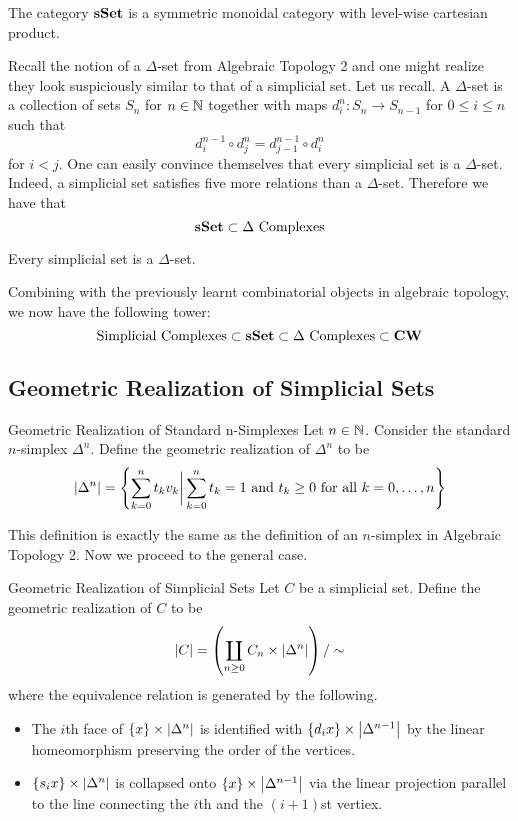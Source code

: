 \documentclass[a4paper]{article}
\begin{document}
\begin{thm}{}{} The category $\bold{sSet}$ is a symmetric monoidal category with level-wise cartesian product. 
\end{thm}

Recall the notion of a $\Delta$-set from Algebraic Topology 2 and one might realize they look suspiciously similar to that of a simplicial set. Let us recall. A $\Delta$-set is a collection of sets $S_n$ for $n\in\mathbb{N}$ together with maps $d_i^n:S_n\to S_{n-1}$ for $0\leq i\leq n$ such that $$d_i^{n-1}\circ d_j^n=d_{j-1}^{n-1}\circ d_i^n$$ for $i<j$. One can easily convince themselves that every simplicial set is a $\Delta$-set. Indeed, a simplicial set satisfies five more relations than a $\Delta$-set. Therefore we have that $$\bold{sSet}\subset\Delta\text{ Complexes}$$

\begin{thm}{}{} Every simplicial set is a $\Delta$-set. 
\end{thm}

Combining with the previously learnt combinatorial objects in algebraic topology, we now have the following tower:  $$\text{Simplicial Complexes}\subset\bold{sSet}\subset\Delta\text{ Complexes}\subset\bold{CW}$$

\subsection{Geometric Realization of Simplicial Sets}
\begin{defn}{Geometric Realization of Standard n-Simplexes}{} Let $n\in\mathbb{N}$. Consider the standard $n$-simplex $\Delta^n$. Define the geometric realization of $\Delta^n$ to be $$\abs{\Delta^n}=\left\{\sum_{k=0}^nt_kv_k\bigg{|}\sum_{k=0}^nt_k=1\text{ and }t_k\geq 0\text{ for all }k=0,\dots,n\right\}$$
\end{defn}

This definition is exactly the same as the definition of an $n$-simplex in Algebraic Topology 2. Now we proceed to the general case. 

\begin{defn}{Geometric Realization of Simplicial Sets}{} Let $C$ be a simplicial set. Define the geometric realization of $C$ to be $$\abs{C}=\left(\coprod_{n\geq 0}C_n\times\abs{\Delta^n}\right)/\sim$$ where the equivalence relation is generated by the following. 
\begin{itemize}
\item The $i$th face of $\{x\}\times\abs{\Delta^n}$ is identified with $\{d_ix\}\times\abs{\Delta^{n-1}}$ by the linear homeomorphism preserving the order of the vertices. 
\item $\{s_ix\}\times\abs{\Delta^n}$ is collapsed onto $\{x\}\times\abs{\Delta^{n-1}}$ via the linear projection parallel to the line connecting the $i$th and the $(i+1)$st vertiex. 
\end{itemize}
\end{defn}
\end{document}
